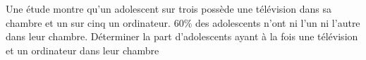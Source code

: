 
Une étude montre qu'un adolescent sur trois possède une télévision dans sa chambre et un sur cinq un ordinateur. 60\% des adolescents n'ont ni l'un ni l'autre dans leur chambre. Déterminer la part d'adolescents ayant à la fois une télévision et un ordinateur dans leur chambre